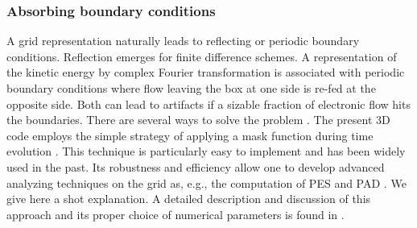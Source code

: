 \documentclass[final,1p]{elsarticle}
\begin{document}
\subsubsection{Absorbing boundary conditions}
\label{sec:abso}


A grid representation naturally leads to reflecting or periodic
boundary conditions.  Reflection emerges for finite difference
schemes.  A representation of the kinetic energy by complex Fourier
transformation is associated with periodic boundary conditions where
flow leaving the box at one side is re-fed at the opposite side. Both
can lead to artifacts if a sizable fraction of electronic flow hits
the boundaries.  There are several ways to solve the problem
\cite{Wop14aR}.  The present 3D code employs the simple strategy of
applying a mask function during time evolution \cite{Kra92a}. This
technique is particularly easy to implement and has been widely used
in the past. Its robustness and efficiency allow one to develop
advanced analyzing techniques on the grid as, e.g., the computation of
PES and PAD \cite{Rei06f}.  We give here a shot explanation.  A
detailed description and discussion of this approach and its proper
choice of numerical parameters is found in \cite{Rei06c}.
\end{document}
